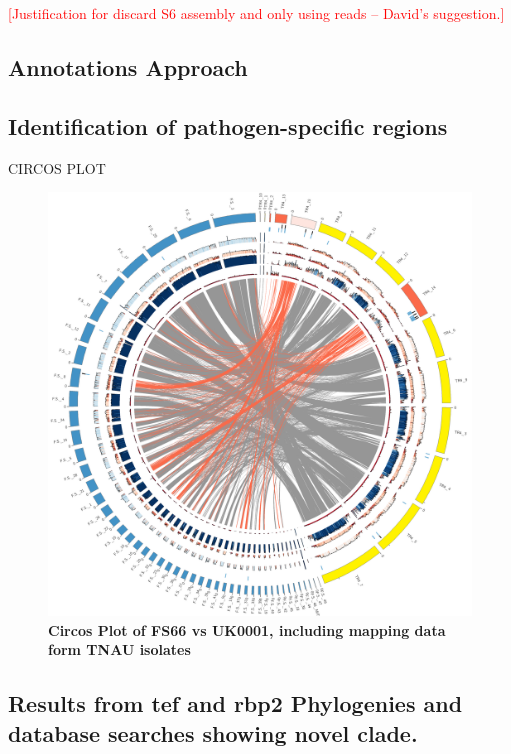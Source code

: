 

\textcolor{red}{[Justification for discard S6 assembly and only using reads – David’s suggestion.]}

\subsection{Annotations Approach}

\subsection{Identification of pathogen-specific regions}
CIRCOS PLOT

\begin{figure}[htp!]
  \centering
  \includegraphics[width=15cm]{Figures/circos.png}
  \caption[Circos Plot of FS66 vs UK0001, including mapping data form TNAU isolates]{\textbf{Circos Plot of FS66 vs UK0001, including mapping data form TNAU isolates}}
  \label{TNAUCircos}
\end{figure}

\subsection{Results from \acf{tef} and \acf{rbp2} Phylogenies and database searches showing novel clade.}

